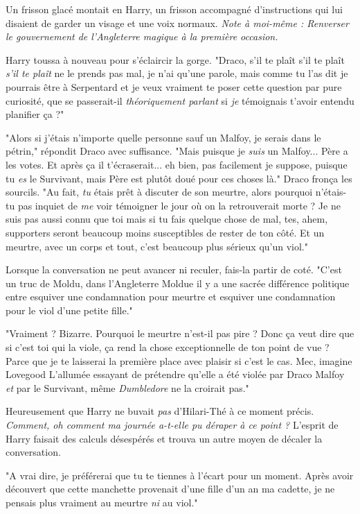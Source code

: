 Un frisson glacé montait en Harry, un frisson accompagné d'instructions qui lui disaient de garder un visage et une voix normaux. \emph{Note à moi-même : Renverser le gouvernement de l'Angleterre magique à la première occasion.} 

Harry toussa à nouveau pour s'éclaircir la gorge. "Draco, s'il te plaît s'il te plaît \emph{s'il te plaît}  ne le prends pas mal, je n'ai qu'une parole, mais comme tu l'as dit je pourrais être à Serpentard et je veux vraiment te poser cette question par pure curiosité, que se passerait-il \emph{théoriquement parlant}  si \emph{je}  témoignais t'avoir entendu planifier ça ?"

"Alors si j'étais n'importe quelle personne sauf un Malfoy, je serais dans le pétrin," répondit Draco avec suffisance. "Mais puisque je \emph{suis}  un Malfoy... Père a les votes. Et après ça il t'écraserait... eh bien, pas facilement je suppose, puisque tu \emph{es}  le Survivant, mais Père est plutôt doué pour ces choses là." Draco fronça les sourcils. "Au fait, \emph{tu}  étais prêt à discuter de son meurtre, alors pourquoi n'étais-tu pas inquiet de \emph{me}  voir témoigner le jour où on la retrouverait morte ? Je ne suis pas aussi connu que toi mais si tu fais quelque chose de mal, tes, ahem, supporters seront beaucoup moins susceptibles de rester de ton côté. Et un meurtre, avec un corps et tout, c'est beaucoup plus sérieux qu'un viol."

Lorsque la conversation ne peut avancer ni reculer, fais-la partir de coté. "C'est un truc de Moldu, dans l'Angleterre Moldue il y a une sacrée différence politique entre esquiver une condamnation pour meurtre et esquiver une condamnation pour le viol d'une petite fille."

"Vraiment ? Bizarre. Pourquoi le meurtre n'est-il pas pire ? Donc ça veut dire que si c'est toi qui la viole, ça rend la chose exceptionnelle de ton point de vue ? Parce que je te laisserai la première place avec plaisir si c'est le cas. Mec, imagine Lovegood L'allumée essayant de prétendre qu'elle a été violée par Draco Malfoy \emph{et}  par le Survivant, même \emph{Dumbledore}  ne la croirait pas."

Heureusement que Harry ne buvait \emph{pas } d'Hilari-Thé à ce moment précis. \emph{Comment, oh comment ma journée a-t-elle pu déraper à ce point ?}  L'esprit de Harry faisait des calculs désespérés et trouva un autre moyen de décaler la conversation.

"A vrai dire, je préférerai que tu te tiennes à l'écart pour un moment. Après avoir découvert que cette manchette provenait d'une fille d'un an ma cadette, je ne pensais plus vraiment au meurtre \emph{ni}  au viol."

